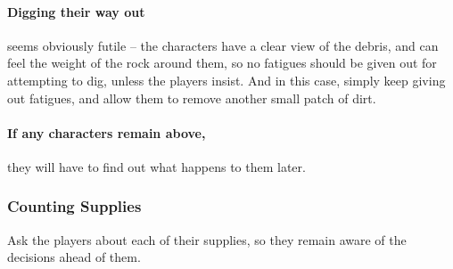 \begin{multicols}{2}
\paragraph{Digging their way out}
seems obviously futile -- the characters have a clear view of the debris, and can feel the weight of the rock around them, so no \glspl{fatigue} should be given out for attempting to dig, unless the players insist.
And in this case, simply keep giving out \glspl{fatigue}, and allow them to remove another small patch of dirt.

\paragraph{If any characters remain above,}
they will have to find out what happens to them later.

\subsubsection{Counting Supplies}

Ask the players about each of their supplies, so they remain aware of the decisions ahead of them.

\end{multicols}
